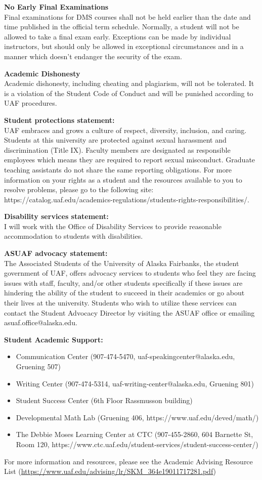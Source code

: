 \documentclass[12pt]{article}
\renewcommand{\emph}[1]{\textsf{\textbf{#1}}}
\newcommand{\localhead}[1]{\par\smallskip\textbf{#1}\nobreak\\}%
\def\subheading#1{\localhead{\emph{#1}}}
\begin{document}
\subheading{No Early Final Examinations}
Final examinations for DMS
  courses shall not be held earlier than the date and time published
  in the official term schedule. Normally, a student will not be
  allowed to take a final exam early. Exceptions can be made by
  individual instructors, but should only be allowed in exceptional
  circumstances and in a manner which doesn't endanger the security of
  the exam.

\subheading{Academic Dishonesty}
Academic dishonesty, including cheating and plagiarism, will not
be tolerated.  It is a violation of the Student Code of Conduct
and will be punished according to UAF procedures.

 
\subheading{ Student protections statement:} UAF embraces and grows a culture of respect, diversity, inclusion, and caring. Students at this university are protected against sexual harassment and discrimination (Title IX). Faculty members are designated as responsible employees which means they are required to report sexual misconduct. Graduate teaching assistants do not share the same reporting obligations. For more information on your rights as a student and the resources available to you to resolve problems, please go to the following site: https://catalog.uaf.edu/academics-regulations/students-rights-responsibilities/.

\subheading{Disability services statement:} I will work with the Office of Disability Services to provide reasonable accommodation to students with disabilities.

\subheading{ASUAF advocacy statement:} The Associated Students of the University of Alaska Fairbanks, the student government of UAF, offers advocacy services to students who feel they are facing issues with staff, faculty, and/or other students specifically if these issues are hindering the ability of the student to succeed in their academics or go about their lives at the university. Students who wish to utilize these services can contact the Student Advocacy Director by visiting the ASUAF office or emailing asuaf.office@alaska.edu. 

\subheading{Student Academic Support:}
\begin{itemize}
\item Communication Center (907-474-5470, uaf-speakingcenter@alaska.edu, Gruening 507)
\item Writing Center (907-474-5314, uaf-writing-center@alaska.edu, Gruening 801)
\item Student Success Center (6th Floor Rassmusson building)
\item Developmental Math Lab (Gruening 406, https://www.uaf.edu/deved/math/)
\item The Debbie Moses Learning Center at CTC (907-455-2860, 604 Barnette St, Room 120, https://www.ctc.uaf.edu/student-services/student-success-center/)
\end{itemize}
For more information and resources, please see the Academic Advising Resource List (\url{https://www.uaf.edu/advising/lr/SKM_364e19011717281.pdf})
\end{document}
